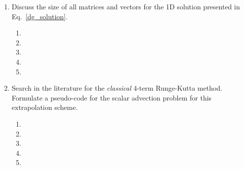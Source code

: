 \begin{enumerate}
\begin{enumerate}
\item[] 
\end{enumerate}
\item
Discuss the size of all matrices and vectors for the 1D solution presented in Eq.~\ref{dg_solution}.
\begin{enumerate}
\item[]
\item[]
\item[] 
\item[]
\item[] 
\end{enumerate}
\item
Search in the literature for the {\it classical} 4-term Runge-Kutta method. Formulate a pseudo-code for the scalar advection problem for this extrapolation scheme. 
\begin{enumerate}
\item[]
\item[]
\item[] 
\item[]
\item[] 
\end{enumerate}
\end{enumerate}

